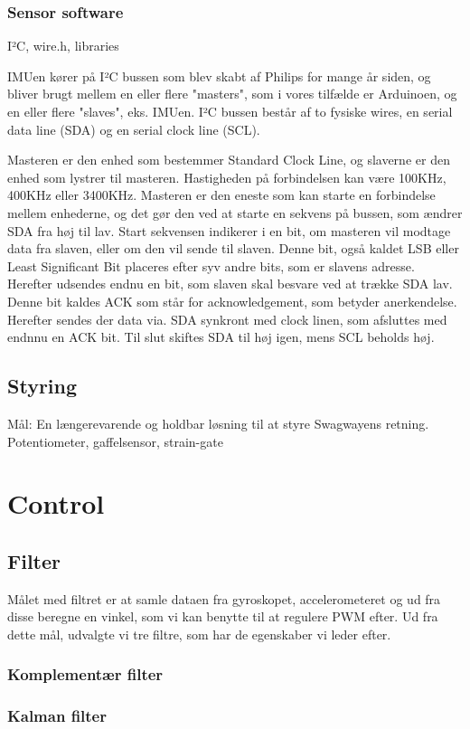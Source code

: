 \documentclass[a4paper,oneside,article,danish,table]{memoir}
\begin{document}
\subsection{Sensor software}
I²C, wire.h, libraries

IMUen kører på I²C bussen som blev skabt af Philips for mange år siden, og bliver brugt mellem en eller flere "masters", som i vores tilfælde er Arduinoen, og en eller flere "slaves", eks. IMUen. I²C bussen består af to fysiske wires, en serial data line (SDA) og en serial clock line (SCL). 

Masteren er den enhed som bestemmer Standard Clock Line, og slaverne er den enhed som lystrer til masteren. Hastigheden på forbindelsen kan være 100KHz, 400KHz eller 3400KHz. Masteren er den eneste som kan starte en forbindelse mellem enhederne, og det gør den ved at starte en sekvens på bussen, som ændrer SDA fra høj til lav. Start sekvensen indikerer i en bit, om masteren vil modtage data fra slaven, eller om den vil sende til slaven. Denne bit, også kaldet LSB eller Least Significant Bit placeres efter syv andre bits, som er slavens adresse. Herefter udsendes endnu en bit, som slaven skal besvare ved at trække SDA lav. Denne bit kaldes ACK som står for acknowledgement, som betyder anerkendelse. Herefter sendes der data via. SDA synkront med clock linen, som afsluttes med endnnu en ACK bit. Til slut skiftes SDA til høj igen, mens SCL beholds høj.  
\section{Styring}
Mål: En længerevarende og holdbar løsning til at styre Swagwayens retning.
Potentiometer, gaffelsensor, strain-gate

\chapter{Control}
\section{Filter}
Målet med filtret er at samle dataen fra gyroskopet, accelerometeret og ud fra disse beregne en vinkel, som vi kan benytte til at regulere PWM efter. Ud fra dette mål, udvalgte vi tre filtre, som har de egenskaber vi leder efter.
\subsection{Komplementær filter}
\subsection{Kalman filter}
\end{document}
